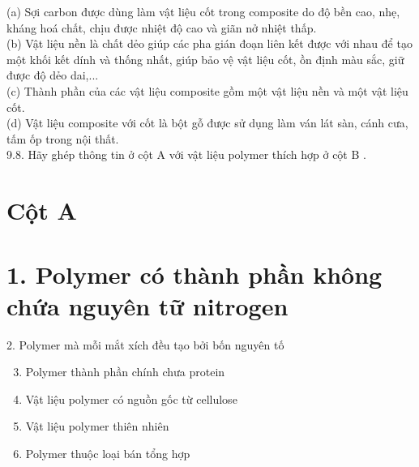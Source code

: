 \documentclass[10pt]{article}
\begin{document}
(a) Sợi carbon được dùng làm vật liệu cốt trong composite do độ bền cao, nhẹ, kháng hoá chất, chịu được nhiệt độ cao và giãn nở nhiệt thấp.\\
(b) Vật liệu nền là chất dẻo giúp các pha gián đoạn liên kết được với nhau để tạo một khối kết dính và thống nhất, giúp bảo vệ vật liệu cốt, ồn định màu sắc, giữ được độ dẻo dai,...\\
(c) Thành phần của các vật liệu composite gồm một vật liệu nền và một vật liệu cốt.\\
(d) Vật liệu composite với cốt là bột gỗ được sử dụng làm ván lát sàn, cánh cưa, tấm ốp trong nội thất.\\
9.8. Hãy ghép thông tin ở cột A với vật liệu polymer thích hợp ở cột B .

\section*{Cột A}
\section*{1. Polymer có thành phần không chứa nguyên tữ nitrogen}
2. Polymer mà mỗi mắt xích đều tạo bởi bốn nguyên tố\begin{enumerate}
  \setcounter{enumi}{2}
  \item Polymer thành phần chính chưa protein
  \item Vật liệu polymer có nguồn gốc từ cellulose
  \item Vật liệu polymer thiên nhiên
  \item Polymer thuộc loại bán tổng hợp
\end{enumerate}
\end{document}
